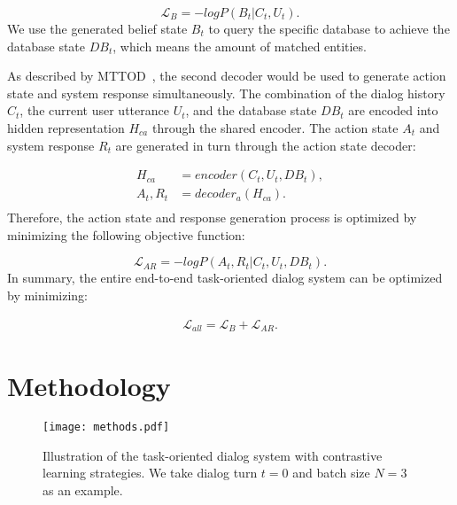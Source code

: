 {\footnotesize
\begin{equation}
\mathcal{L}_{B} =  -log P(B_t|C_{t},U_t).
\end{equation}}%
We use the generated belief state $B_t$ to query the specific database to achieve the database state $DB_t$, which means the amount of matched entities.

As described by MTTOD~\cite{lee-2021-improving-end}, the second decoder would be used to generate action state and system response simultaneously.
The combination of the dialog history $C_t$, the  current user utterance $U_t$, and  the database state $DB_t$ are encoded into hidden representation $H_{ca}$ through the shared encoder. The action state $A_t$  and system response $R_t$  are  generated in turn through the action state decoder:

{\footnotesize
\setlength{\abovedisplayskip}{0.005cm}
\setlength{\belowdisplayskip}{0.005cm}
\begin{equation}
\begin{aligned}
H_{ca} &= encoder(C_{t},U_t,DB_{t}),\\
A_t,R_t &= decoder_a(H_{ca}).\\
\end{aligned}
\end{equation}}%
 Therefore, the action state  and  response generation process is optimized by minimizing the following objective function:
 
 {\footnotesize
\setlength{\abovedisplayskip}{0.005cm}
\setlength{\belowdisplayskip}{0.005cm}
\begin{equation}
\mathcal{L}_{AR} =   -log P(A_t,R_t|C_{t},U_t,DB_{t}).
\end{equation}}%
 In summary, the entire end-to-end task-oriented dialog system can be optimized by minimizing:
 
 {\footnotesize
 \setlength{\abovedisplayskip}{0.005cm}
\setlength{\belowdisplayskip}{0.005cm}
\begin{equation}
\begin{aligned}
\mathcal{L}_{all} = \mathcal{L}_{B} + \mathcal{L}_{AR}.
\end{aligned}
\end{equation}}%
\section{Methodology}

\begin{figure*}[t]
  \centering
  \texttt{[image: methods.pdf]}
  \caption{Illustration of the  task-oriented dialog system with contrastive learning strategies. We take dialog turn $t=0$ and batch size $N=3$ as an example.}  %
  \label{fig:methods}
\end{figure*}

